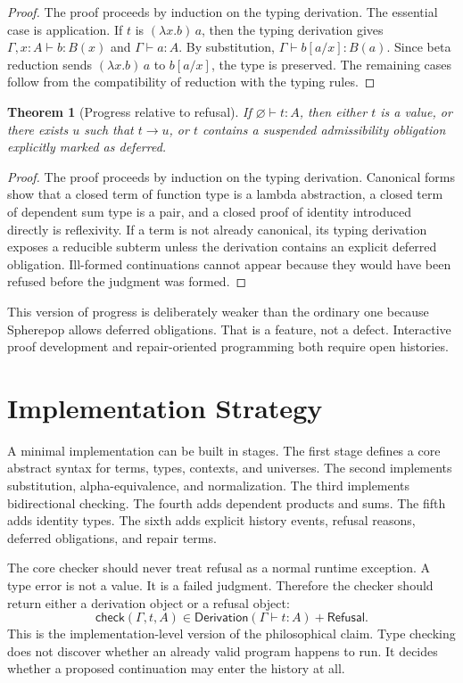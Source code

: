 \documentclass[12pt,oneside]{article}
\newtheorem{theorem}[definition]{Theorem}
\newcommand{\step}{\longrightarrow}
\newcommand{\judges}{\vdash}
\begin{document}
\begin{proof}
The proof proceeds by induction on the typing derivation. The essential case is application. If $t$ is $(\lambda x.b)\,a$, then the typing derivation gives $\Gamma,x:A \judges b:B(x)$ and $\Gamma \judges a:A$. By substitution, $\Gamma \judges b[a/x]:B(a)$. Since beta reduction sends $(\lambda x.b)\,a$ to $b[a/x]$, the type is preserved. The remaining cases follow from the compatibility of reduction with the typing rules.
\end{proof}

\begin{theorem}[Progress relative to refusal]
If $\varnothing \judges t:A$, then either $t$ is a value, or there exists $u$ such that $t \step u$, or $t$ contains a suspended admissibility obligation explicitly marked as deferred.
\end{theorem}

\begin{proof}
The proof proceeds by induction on the typing derivation. Canonical forms show that a closed term of function type is a lambda abstraction, a closed term of dependent sum type is a pair, and a closed proof of identity introduced directly is reflexivity. If a term is not already canonical, its typing derivation exposes a reducible subterm unless the derivation contains an explicit deferred obligation. Ill-formed continuations cannot appear because they would have been refused before the judgment was formed.
\end{proof}

This version of progress is deliberately weaker than the ordinary one because Spherepop allows deferred obligations. That is a feature, not a defect. Interactive proof development and repair-oriented programming both require open histories.

\section{Implementation Strategy}

A minimal implementation can be built in stages. The first stage defines a core abstract syntax for terms, types, contexts, and universes. The second implements substitution, alpha-equivalence, and normalization. The third implements bidirectional checking. The fourth adds dependent products and sums. The fifth adds identity types. The sixth adds explicit history events, refusal reasons, deferred obligations, and repair terms.

The core checker should never treat refusal as a normal runtime exception. A type error is not a value. It is a failed judgment. Therefore the checker should return either a derivation object or a refusal object:
\[
\mathsf{check}(\Gamma,t,A)
\in
\mathsf{Derivation}(\Gamma \judges t:A)
+
\mathsf{Refusal}.
\]
This is the implementation-level version of the philosophical claim. Type checking does not discover whether an already valid program happens to run. It decides whether a proposed continuation may enter the history at all.
\end{document}
